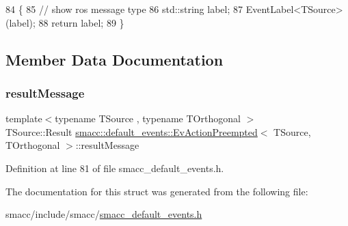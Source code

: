 \begin{DoxyCode}
84   \{
85     \textcolor{comment}{// show ros message type}
86     std::string label;
87     EventLabel<TSource>(label);
88     \textcolor{keywordflow}{return} label;
89   \}
\end{DoxyCode}


\subsection{Member Data Documentation}
\mbox{\label{structsmacc_1_1default__events_1_1EvActionPreempted_a07cab331973c3f9ffbac697d6c2f6f91}} 
\subsubsection{\texorpdfstring{result\+Message}{resultMessage}}
{\footnotesize\ttfamily template$<$typename T\+Source , typename T\+Orthogonal $>$ \\
T\+Source\+::\+Result \hyperlink{structsmacc_1_1default__events_1_1EvActionPreempted}{smacc\+::default\+\_\+events\+::\+Ev\+Action\+Preempted}$<$ T\+Source, T\+Orthogonal $>$\+::result\+Message}



Definition at line 81 of file smacc\+\_\+default\+\_\+events.\+h.



The documentation for this struct was generated from the following file\+:\begin{DoxyCompactItemize}
\item 
smacc/include/smacc/\hyperlink{smacc__default__events_8h}{smacc\+\_\+default\+\_\+events.\+h}\end{DoxyCompactItemize}
